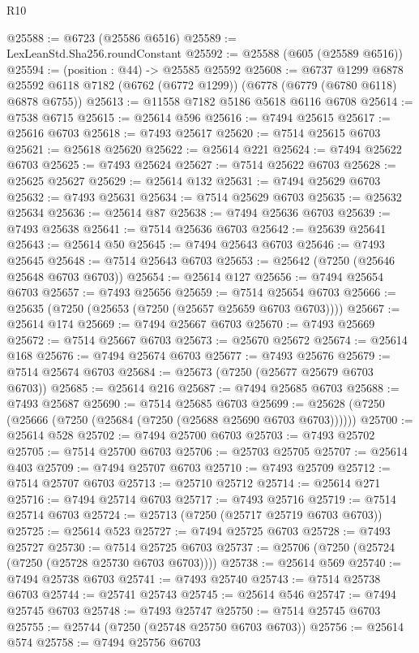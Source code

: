 \begin{lexlean}{R10}
\begin{coremodule}
@25588 := @6723 (@25586 @6516)
@25589 := LexLeanStd.Sha256.roundConstant
@25592 := @25588 (@605 (@25589 @6516))
@25594 := (position : @44) -> @25585 @25592
@25608 := @6737
    @1299
    @6878
    @25592
    @6118
    @7182
    (@6762 (@6772 @1299))
    (@6778 (@6779 (@6780 @6118) @6878 @6755))
@25613 := @11558 @7182 @5186 @5618 @6116 @6708
@25614 := @7538 @6715
@25615 := @25614 @596
@25616 := @7494 @25615
@25617 := @25616 @6703
@25618 := @7493 @25617
@25620 := @7514 @25615 @6703
@25621 := @25618 @25620
@25622 := @25614 @221
@25624 := @7494 @25622 @6703
@25625 := @7493 @25624
@25627 := @7514 @25622 @6703
@25628 := @25625 @25627
@25629 := @25614 @132
@25631 := @7494 @25629 @6703
@25632 := @7493 @25631
@25634 := @7514 @25629 @6703
@25635 := @25632 @25634
@25636 := @25614 @87
@25638 := @7494 @25636 @6703
@25639 := @7493 @25638
@25641 := @7514 @25636 @6703
@25642 := @25639 @25641
@25643 := @25614 @50
@25645 := @7494 @25643 @6703
@25646 := @7493 @25645
@25648 := @7514 @25643 @6703
@25653 := @25642 (@7250 (@25646 @25648 @6703 @6703))
@25654 := @25614 @127
@25656 := @7494 @25654 @6703
@25657 := @7493 @25656
@25659 := @7514 @25654 @6703
@25666 := @25635 (@7250 (@25653 (@7250 (@25657 @25659 @6703 @6703))))
@25667 := @25614 @174
@25669 := @7494 @25667 @6703
@25670 := @7493 @25669
@25672 := @7514 @25667 @6703
@25673 := @25670 @25672
@25674 := @25614 @168
@25676 := @7494 @25674 @6703
@25677 := @7493 @25676
@25679 := @7514 @25674 @6703
@25684 := @25673 (@7250 (@25677 @25679 @6703 @6703))
@25685 := @25614 @216
@25687 := @7494 @25685 @6703
@25688 := @7493 @25687
@25690 := @7514 @25685 @6703
@25699 := @25628 (@7250 (@25666 (@7250 (@25684 (@7250 (@25688 @25690 @6703 @6703))))))
@25700 := @25614 @528
@25702 := @7494 @25700 @6703
@25703 := @7493 @25702
@25705 := @7514 @25700 @6703
@25706 := @25703 @25705
@25707 := @25614 @403
@25709 := @7494 @25707 @6703
@25710 := @7493 @25709
@25712 := @7514 @25707 @6703
@25713 := @25710 @25712
@25714 := @25614 @271
@25716 := @7494 @25714 @6703
@25717 := @7493 @25716
@25719 := @7514 @25714 @6703
@25724 := @25713 (@7250 (@25717 @25719 @6703 @6703))
@25725 := @25614 @523
@25727 := @7494 @25725 @6703
@25728 := @7493 @25727
@25730 := @7514 @25725 @6703
@25737 := @25706 (@7250 (@25724 (@7250 (@25728 @25730 @6703 @6703))))
@25738 := @25614 @569
@25740 := @7494 @25738 @6703
@25741 := @7493 @25740
@25743 := @7514 @25738 @6703
@25744 := @25741 @25743
@25745 := @25614 @546
@25747 := @7494 @25745 @6703
@25748 := @7493 @25747
@25750 := @7514 @25745 @6703
@25755 := @25744 (@7250 (@25748 @25750 @6703 @6703))
@25756 := @25614 @574
@25758 := @7494 @25756 @6703

\end{coremodule}
\end{lexlean}
